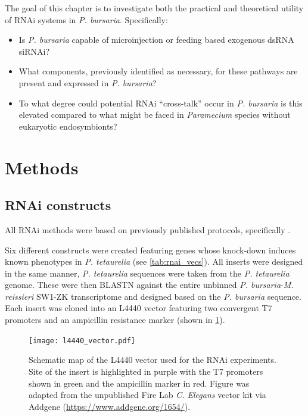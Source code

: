 The goal of this chapter is to investigate both the practical and
theoretical utility of RNAi systems in \textit{P. bursaria}. 
Specifically:
\begin{itemize}
    \item Is \textit{P. bursaria} capable of microinjection or feeding based
        exogenous dsRNA siRNAi?
    \item What components, previously identified as necessary, for these pathways
        are present and expressed in \textit{P. bursaria}? 
    \item To what degree could potential RNAi ``cross-talk'' occur in \textit{P. bursaria}
        is this elevated compared to what might be faced in \textit{Paramecium} species
        without eukaryotic endosymbionts?
\end{itemize}


\section{Methods}

\subsection{RNAi constructs}

All RNAi methods were based on previously published protocols, specifically
\citep{Galvani2001,Galvani2002,Beisson2010}.

Six different constructs were created featuring genes whose knock-down
induces known phenotypes in \textit{P. tetaurelia} (see \cref{tab:rnai_vecs}).
All inserts were designed in the same manner, \textit{P. tetaurelia} sequences
were taken from the \textit{P. tetaurelia} genome. 
These were then BLASTN against the entire unbinned \textit{P. bursaria}-\textit{M. reissieri}
SW1-ZK transcriptome and designed based on the \textit{P. bursaria} sequence.
Each insert was cloned into an L4440 vector featuring two convergent T7 promoters
and an ampicillin resistance marker (shown in \cref{fig:vec_map}). 

\begin{figure}
    \texttt{[image: l4440\_vector.pdf]}
    \caption[L4440 RNAi vector map]{Schematic map of the L4440 vector used for the RNAi experiments. Site of the insert is highlighted in purple with the T7 promoters shown in green and the ampicillin marker in red. Figure was adapted from the unpublished Fire Lab \textit{C. Elegans} vector kit via Addgene (\url{https://www.addgene.org/1654/}).}
    \label{fig:vec_map}
\end{figure}

